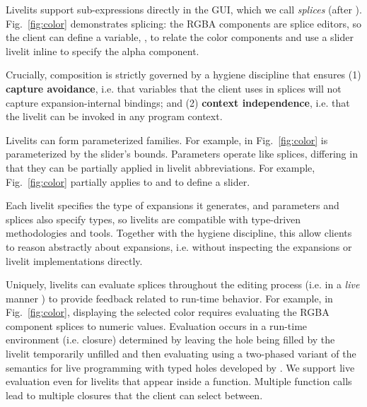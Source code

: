 %
  Livelits support sub-expressions directly in the GUI, which we call \emph{splices} (after
   \citet{TLMs}).
  Fig.~\ref{fig:color} demonstrates splicing: the RGBA components  
  are splice editors, so the client can define a variable, ,
  to relate the color components 
  and use a slider livelit inline to specify the alpha component.
  
  Crucially, composition is strictly 
  governed by a hygiene discipline that ensures
  (1) \textbf{capture avoidance}, i.e. that variables that the client uses in splices 
  will not capture expansion-internal bindings; and 
  (2) \textbf{context independence}, i.e. that the livelit 
  can be invoked in any program context.%

 Livelits can form parameterized families.
  For example,  in Fig.~\ref{fig:color} is parameterized by the slider's bounds.
  Parameters operate like splices, differing in that they can be partially applied in
  livelit abbreviations. For example, Fig.~\ref{fig:color}
  partially applies  to  and  to define a  slider.

 Each livelit specifies the type of expansions it generates, 
and parameters and splices also specify types, 
so livelits are compatible with type-driven methodologies and tools.
Together with the hygiene discipline, this allow clients to reason abstractly about expansions, i.e.  
without inspecting the expansions or livelit implementations directly.

 Uniquely, livelits can evaluate splices 
  throughout the editing process 
  (i.e. in a \emph{live} manner \cite{DBLP:conf/icse/Tanimoto13}) 
  to provide feedback related to run-time behavior.
  For example, in Fig.~\ref{fig:color}, 
  displaying the selected color requires evaluating the RGBA
  component splices to numeric values.
  Evaluation occurs in a run-time environment (i.e. closure) determined by
  leaving the hole being filled by the livelit temporarily unfilled and then evaluating
  using a two-phased variant of the semantics for 
  live programming with typed holes developed by \citet{HazelnutLive}.
  We support live evaluation even for livelits 
  that appear inside a function. Multiple function calls lead 
  to multiple closures that the client 
   can select between.

